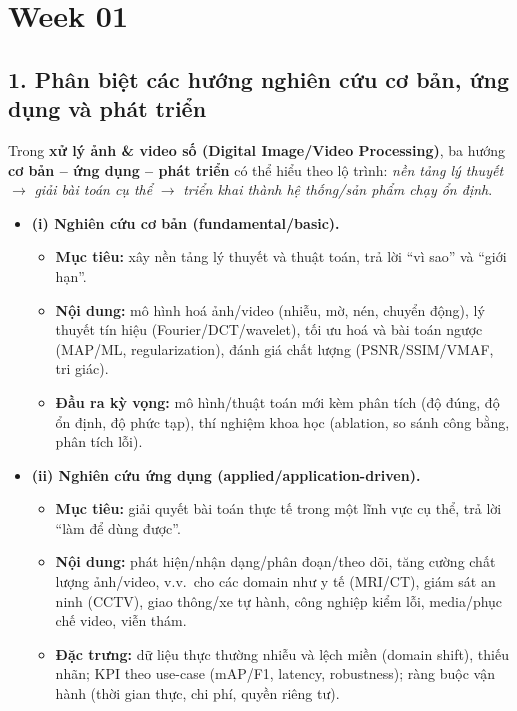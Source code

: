 \section*{Week 01}

\subsection*{1. Phân biệt các hướng nghiên cứu cơ bản, ứng dụng và phát triển}

Trong \textbf{xử lý ảnh \& video số (Digital Image/Video Processing)}, ba hướng \textbf{cơ bản -- ứng dụng -- phát triển}
có thể hiểu theo lộ trình: \emph{nền tảng lý thuyết} $\rightarrow$ \emph{giải bài toán cụ thể} $\rightarrow$
\emph{triển khai thành hệ thống/sản phẩm chạy ổn định}.

\begin{itemize}
  \item \textbf{(i) Nghiên cứu cơ bản (fundamental/basic).}
  \begin{itemize}
    \item \textbf{Mục tiêu:} xây nền tảng lý thuyết và thuật toán, trả lời ``vì sao'' và ``giới hạn''.
    \item \textbf{Nội dung:} mô hình hoá ảnh/video (nhiễu, mờ, nén, chuyển động), lý thuyết tín hiệu (Fourier/DCT/wavelet),
    tối ưu hoá và bài toán ngược (MAP/ML, regularization), đánh giá chất lượng (PSNR/SSIM/VMAF, tri giác).
    \item \textbf{Đầu ra kỳ vọng:} mô hình/thuật toán mới kèm phân tích (độ đúng, độ ổn định, độ phức tạp), thí nghiệm khoa học
    (ablation, so sánh công bằng, phân tích lỗi).
  \end{itemize}

  \item \textbf{(ii) Nghiên cứu ứng dụng (applied/application-driven).}
  \begin{itemize}
    \item \textbf{Mục tiêu:} giải quyết bài toán thực tế trong một lĩnh vực cụ thể, trả lời ``làm để dùng được''.
    \item \textbf{Nội dung:} phát hiện/nhận dạng/phân đoạn/theo dõi, tăng cường chất lượng ảnh/video, v.v.\ cho các domain như
    y tế (MRI/CT), giám sát an ninh (CCTV), giao thông/xe tự hành, công nghiệp kiểm lỗi, media/phục chế video, viễn thám.
    \item \textbf{Đặc trưng:} dữ liệu thực thường nhiễu và lệch miền (domain shift), thiếu nhãn; KPI theo use-case (mAP/F1, latency,
    robustness); ràng buộc vận hành (thời gian thực, chi phí, quyền riêng tư).
  \end{itemize}


\end{itemize}
